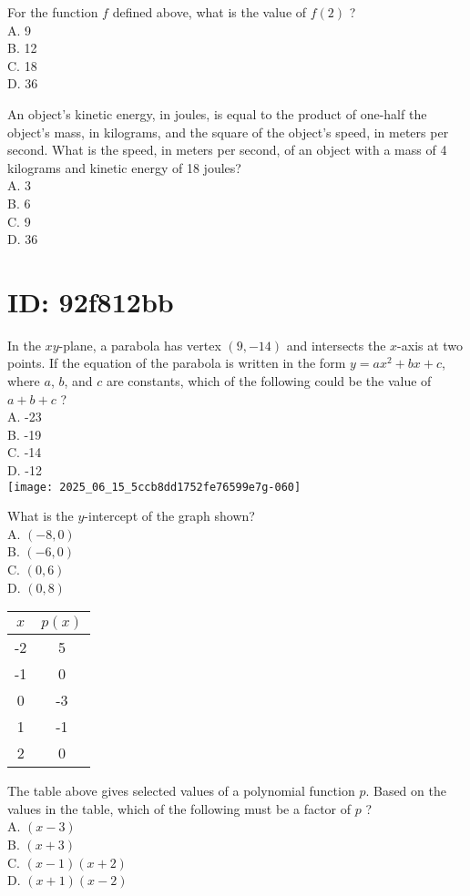 For the function $f$ defined above, what is the value of $f(2)$ ?\\
A. 9\\
B. 12\\
C. 18\\
D. 36

An object's kinetic energy, in joules, is equal to the product of one-half the object's mass, in kilograms, and the square of the object's speed, in meters per second. What is the speed, in meters per second, of an object with a mass of 4 kilograms and kinetic energy of 18 joules?\\
A. 3\\
B. 6\\
C. 9\\
D. 36

\section*{ID: 92f812bb}
In the $x y$-plane, a parabola has vertex $(9,-14)$ and intersects the $x$-axis at two points. If the equation of the parabola is written in the form $y=a x^{2}+b x+c$, where $a$, $b$, and $c$ are constants, which of the following could be the value of $a+b+c$ ?\\
A. -23\\
B. -19\\
C. -14\\
D. -12\\
\texttt{[image: 2025\_06\_15\_5ccb8dd1752fe76599e7g-060]}

What is the $y$-intercept of the graph shown?\\
A. $(-8,0)$\\
B. $(-6,0)$\\
C. $(0,6)$\\
D. $(0,8)$

\begin{center}
\begin{tabular}{|c|c|}
\hline
$x$ & $p(x)$ \\
\hline
-2 & 5 \\
\hline
-1 & 0 \\
\hline
0 & -3 \\
\hline
1 & -1 \\
\hline
2 & 0 \\
\hline
\end{tabular}
\end{center}

The table above gives selected values of a polynomial function $p$. Based on the values in the table, which of the following must be a factor of $p$ ?\\
A. $(x-3)$\\
B. $(x+3)$\\
C. $(x-1)(x+2)$\\
D. $(x+1)(x-2)$


